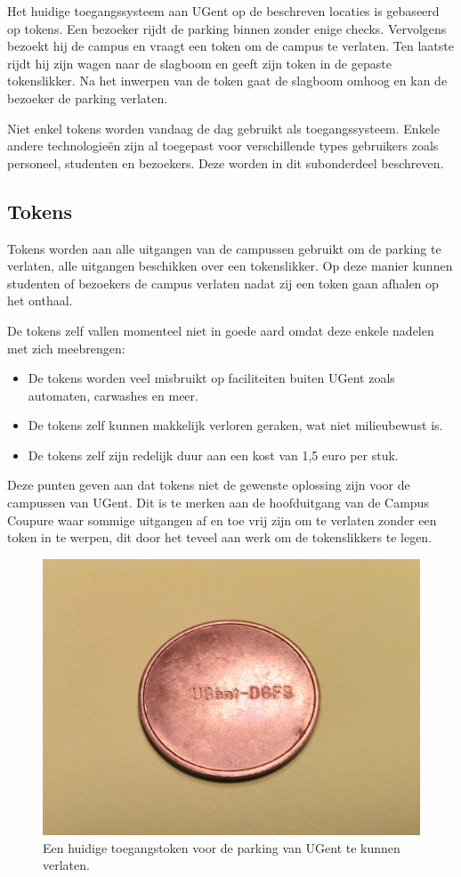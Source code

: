 Het huidige toegangssysteem aan UGent op de beschreven locaties is gebaseerd op tokens. Een bezoeker rijdt de parking binnen zonder enige checks. Vervolgens bezoekt hij de campus en vraagt een token om de campus te verlaten. Ten laatste rijdt hij zijn wagen naar de slagboom en geeft zijn token in de gepaste tokenslikker. Na het inwerpen van de token gaat de slagboom omhoog en kan de bezoeker de parking verlaten.

Niet enkel tokens worden vandaag de dag gebruikt als toegangssysteem. Enkele andere technologieën zijn al toegepast voor verschillende types gebruikers zoals personeel, studenten en bezoekers. Deze worden in dit subonderdeel beschreven.

\subsection{Tokens}

Tokens worden aan alle uitgangen van de campussen gebruikt om de parking te verlaten, alle uitgangen beschikken over een tokenslikker. Op deze manier kunnen studenten of bezoekers de campus verlaten nadat zij een token gaan afhalen op het onthaal.

De tokens zelf vallen momenteel niet in goede aard omdat deze enkele nadelen met zich meebrengen:
\begin{itemize}
	\item De tokens worden veel misbruikt op faciliteiten buiten UGent zoals automaten, carwashes en meer.
	\item De tokens zelf kunnen makkelijk verloren geraken, wat niet milieubewust is.
	\item De tokens zelf zijn redelijk duur aan een kost van 1,5 euro per stuk.
\end{itemize}

Deze punten geven aan dat tokens niet de gewenste oplossing zijn voor de campussen van UGent. Dit is te merken aan de hoofduitgang van de Campus Coupure waar sommige uitgangen af en toe vrij zijn om te verlaten zonder een token in te werpen, dit door het teveel aan werk om de tokenslikkers te legen.

\begin{figure}[h!]
	\centering
	\includegraphics[width=0.5\linewidth]{img/token.jpg}
	\caption{Een huidige toegangstoken voor de parking van UGent te kunnen verlaten.}
\end{figure}

